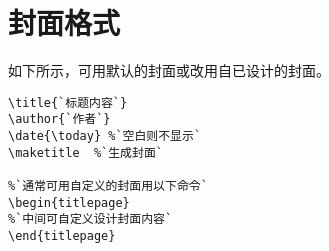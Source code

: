 \section{封面格式}

如下所示，可用默认的封面或改用自已设计的封面。
\begin{lstlisting}[language={[LaTeX]TeX}]
%`以下是默认的封面`
\title{`标题内容`}
\author{`作者`}
\date{\today} %`空白则不显示`
\maketitle  %`生成封面`

%`通常可用自定义的封面用以下命令`
\begin{titlepage}
%`中间可自定义设计封面内容`
\end{titlepage}

\end{lstlisting}
 